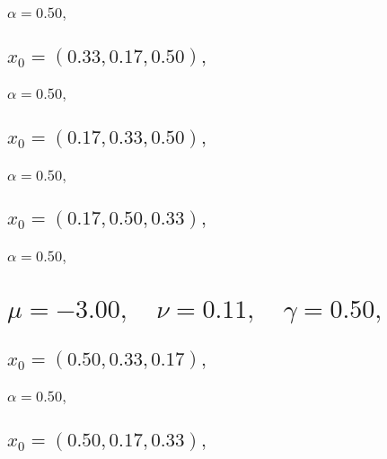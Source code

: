 \documentclass[a4paper]{article}
\begin{document}
\begin{multicols*}{2}
   \subsubsection{\(\alpha = 0.50,\quad \)}
   

   \subsection{\(x_0 = (0.33,0.17,0.50),\quad \)}
   

   \subsubsection{\(\alpha = 0.50,\quad \)}
   

   \subsection{\(x_0 = (0.17,0.33,0.50),\quad \)}
   

   \subsubsection{\(\alpha = 0.50,\quad \)}
   

   \subsection{\(x_0 = (0.17,0.50,0.33),\quad \)}
   

   \subsubsection{\(\alpha = 0.50,\quad \)}
   

   \section{\(\mu = -3.00,\quad \nu = 0.11,\quad \gamma = 0.50,\quad \)}
   

   \subsection{\(x_0 = (0.50,0.33,0.17),\quad \)}
   

   \subsubsection{\(\alpha = 0.50,\quad \)}
   

   \subsection{\(x_0 = (0.50,0.17,0.33),\quad \)}
   


\end{multicols*}
\end{document}
